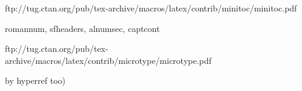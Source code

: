 ftp://tug.ctan.org/pub/tex-archive/macros/latex/contrib/minitoc/minitoc.pdf

romannum, sfheaders, alnumsec, captcont





ftp://tug.ctan.org/pub/tex-archive/macros/latex/contrib/microtype/microtype.pdf
\ifpdf
\usepackage[%
expansion=true, %
protrusion=true
]{microtype}
\fi


by hyperref too)


